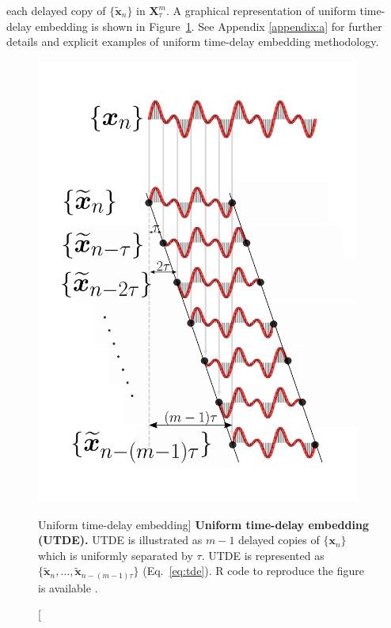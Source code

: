 each delayed copy 
of $\{ \boldsymbol{ \tilde{x} }_n \}$ in $\boldsymbol{X}^{m}_{\tau}$.
A graphical representation of uniform time-delay embedding is shown in 
Figure~\ref{fig:utde}. See Appendix \ref{appendix:a} for further details 
and explicit examples of uniform time-delay embedding methodology. 
\begin{figure}
 \centering
   \includegraphics[width=0.95\textwidth]{utde}
   \caption
	[Uniform time-delay embedding]{
	{\bf Uniform time-delay embedding (UTDE).} 
	UTDE is illustrated as $m-1$ delayed copies
   	of $\{ \boldsymbol{x}_n \}$ which is uniformly separated by $\tau$.
	UTDE is represented as
	$\{ \boldsymbol{ \tilde{x} }_n, \dots,  
	\boldsymbol{ \tilde{x} }_{n -(m-1)\tau}   \}$ (Eq.~\ref{eq:tde}).
	R code to reproduce the figure is available \cite{hwum2018}.
   }
   \label{fig:utde}
\end{figure}

